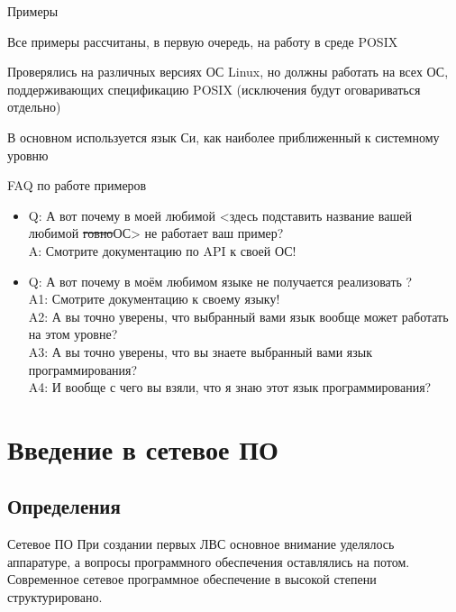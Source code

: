 \begin{frame}{Примеры}
\begin{center}
	Все примеры рассчитаны, в первую очередь, на работу в среде POSIX
\par
	Проверялись на различных версиях ОС Linux, но должны работать на всех ОС, поддерживающих спецификацию POSIX (исключения будут оговариваться отдельно)
\par	
	В основном используется язык Си, как наиболее приближенный к системному уровню
\end{center}
\end{frame}

\begin{frame}{FAQ по работе примеров}
	\begin{itemize}
		\item Q: А вот почему в моей любимой {\footnotesize <здесь подставить название вашей любимой \sout{говно}ОС>} не работает ваш пример?\\
	A: Смотрите документацию по API к своей ОС!
		\item Q: А вот почему в моём любимом языке {\footnotesize <здесь подставить название вашего любимого языка>} не получается реализовать {\footnotesize <здесь подставить название фичи, которую не получается использовать>}?\\
	A1: Смотрите документацию к своему языку!\\
	A2: А вы точно уверены, что выбранный вами язык вообще может работать на этом уровне?\\
	A3: А вы точно уверены, что вы знаете выбранный вами язык программирования?\\
	A4: И вообще с чего вы взяли, что я знаю этот язык программирования?
	\end{itemize}
\end{frame}


\section{Введение в сетевое ПО}
\subsection{Определения}

\begin{frame}{Сетевое ПО}
	При создании первых ЛВС основное внимание уделялось аппаратуре,  а вопросы программного обеспечения оставлялись на потом.
	Современное сетевое программное обеспечение в высокой степени структурировано.
\end{frame}

